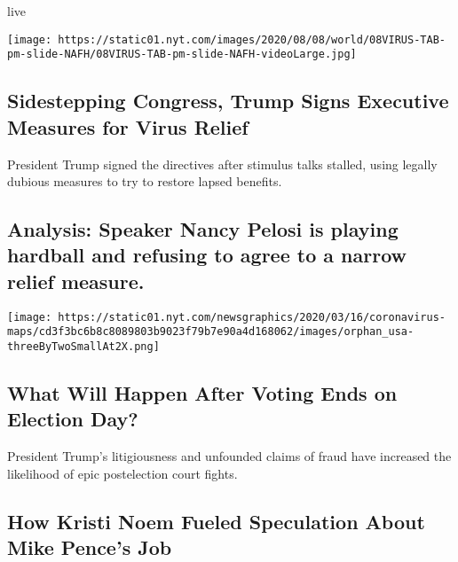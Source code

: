 live

\texttt{[image: https://static01.nyt.com/images/2020/08/08/world/08VIRUS-TAB-pm-slide-NAFH/08VIRUS-TAB-pm-slide-NAFH-videoLarge.jpg]}

\href{/2020/08/08/us/politics/trump-stimulus-bill-coronavirus.html}{}

\hypertarget{sidestepping-congress-trump-signs-executive-measures-for-virus-relief}{%
\subsection{Sidestepping Congress, Trump Signs Executive Measures for
Virus
Relief}\label{sidestepping-congress-trump-signs-executive-measures-for-virus-relief}}

President Trump signed the directives after stimulus talks stalled,
using legally dubious measures to try to restore lapsed benefits.

\href{/2020/08/08/us/politics/nancy-pelosi-coronavirus-relief.html}{}

\hypertarget{analysis-speaker-nancy-pelosi-is-playing-hardball-and-refusing-to-agree-to-a-narrow-relief-measure}{%
\subsection{Analysis: Speaker Nancy Pelosi is playing hardball and
refusing to agree to a narrow relief
measure.}\label{analysis-speaker-nancy-pelosi-is-playing-hardball-and-refusing-to-agree-to-a-narrow-relief-measure}}

\texttt{[image: https://static01.nyt.com/newsgraphics/2020/03/16/coronavirus-maps/cd3f3bc6b8c8089803b9023f79b7e90a4d168062/images/orphan\_usa-threeByTwoSmallAt2X.png]}

\href{/2020/08/08/us/politics/voting-nov-3-election.html}{}

\hypertarget{what-will-happen-after-voting-ends-on-election-day}{%
\subsection{What Will Happen After Voting Ends on Election
Day?}\label{what-will-happen-after-voting-ends-on-election-day}}

President Trump's litigiousness and unfounded claims of fraud have
increased the likelihood of epic postelection court fights.

\href{/2020/08/08/us/politics/kristi-noem-pence-trump.html}{}

\hypertarget{how-kristi-noem-fueled-speculation-about-mike-pences-job}{%
\subsection{How Kristi Noem Fueled Speculation About Mike Pence's
Job}\label{how-kristi-noem-fueled-speculation-about-mike-pences-job}}


